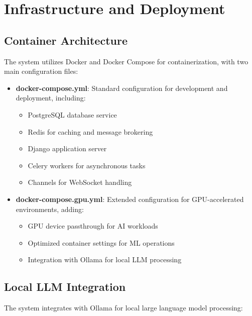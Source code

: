 \section{Infrastructure and Deployment}

\subsection{Container Architecture}
The system utilizes Docker and Docker Compose for containerization, with two main configuration files:

\begin{itemize}
  \item \textbf{docker-compose.yml}: Standard configuration for development and deployment, including:
    \begin{itemize}
      \item PostgreSQL database service
      \item Redis for caching and message brokering
      \item Django application server
      \item Celery workers for asynchronous tasks
      \item Channels for WebSocket handling
    \end{itemize}
    
  \item \textbf{docker-compose.gpu.yml}: Extended configuration for GPU-accelerated environments, adding:
    \begin{itemize}
      \item GPU device passthrough for AI workloads
      \item Optimized container settings for ML operations
      \item Integration with Ollama for local LLM processing
    \end{itemize}
\end{itemize}

\subsection{Local LLM Integration}
The system integrates with Ollama for local large language model processing:

